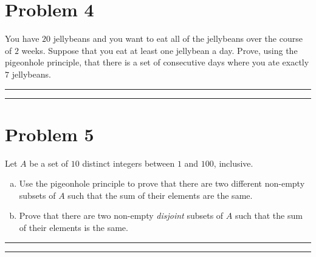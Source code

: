 \documentclass{article}
\theoremstyle{definition}
\newenvironment{solution}{\bigskip\hrule{\hfill}}{\bigskip\hrule{\hfill}} %
\begin{document}

\newpage


\section*{Problem 4}
You have $20$ jellybeans and you want to eat all of the jellybeans over the course of $2$ weeks. Suppose that you eat at least one jellybean a day. Prove, using the pigeonhole principle, that there is a set of consecutive days where you ate exactly $7$ jellybeans.

\begin{solution}


\end{solution}


\newpage


\section*{Problem 5}
Let $A$ be a set of $10$ distinct integers between $1$ and $100$, inclusive.
\begin{enumerate}[a)] %
    \item Use the pigeonhole principle to prove that there are two different non-empty subsets of $A$ such that the sum of their elements are the same.
    \item Prove that there are two non-empty \emph{disjoint} subsets of $A$ such that the sum of their elements is the same.
\end{enumerate}
\begin{solution}


\end{solution}
\end{document}
